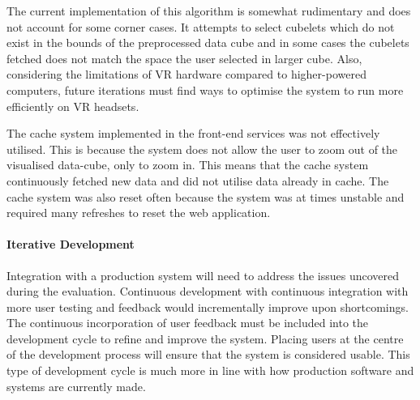 The current implementation of this algorithm is somewhat rudimentary and does not account for some corner cases.
It attempts to select cubelets which do not exist in the bounds of the preprocessed data cube and in some cases the cubelets fetched does not match the space the user selected in larger cube.
Also, considering the limitations of VR hardware compared to higher-powered computers, future iterations must find ways to optimise the system to run more efficiently on VR headsets.

The cache system implemented in the front-end services was not effectively utilised.
This is because the system does not allow the user to zoom out of the visualised data-cube, only to zoom in.
This means that the cache system continuously fetched new data and did not utilise data already in cache.
The cache system was also reset often because the system was at times unstable and required many refreshes to reset the web application.

\paragraph{Iterative Development}
Integration with a production system will need to address the issues uncovered during the evaluation.
Continuous development with continuous integration with more user testing and feedback would incrementally improve upon shortcomings.
The continuous incorporation of user feedback must be included into the development cycle to refine and improve the system.
Placing users at the centre of the development process will ensure that the system is considered usable.
This type of development cycle is much more in line with how production software and systems are currently made.
